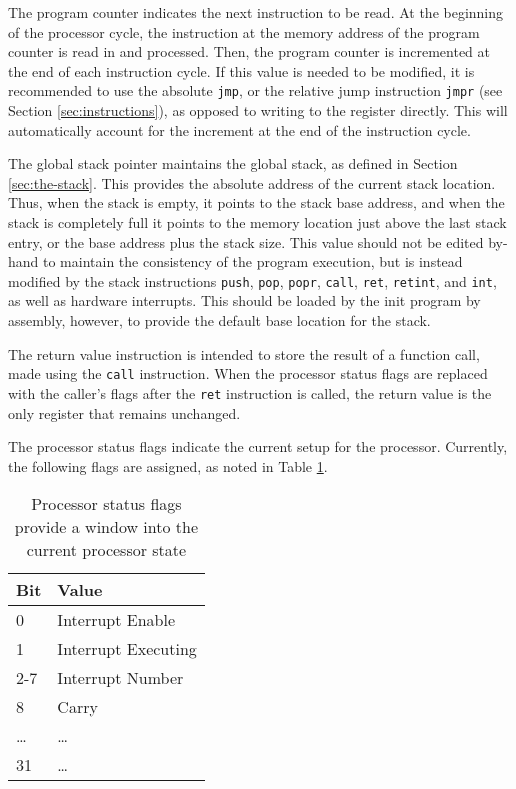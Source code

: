 \documentclass{article}
\begin{document}
The program counter indicates the next instruction to be read. At the beginning of the processor cycle, the instruction at the memory address of the program counter is read in and processed. Then, the program counter is incremented at the end of each instruction cycle. If this value is needed to be modified, it is recommended to use the absolute \texttt{jmp}, or the relative jump instruction \texttt{jmpr} (see Section \ref{sec:instructions}), as opposed to writing to the register directly. This will automatically account for the increment at the end of the instruction cycle.

The global stack pointer maintains the global stack, as defined in Section \ref{sec:the-stack}. This provides the absolute address of the current stack location. Thus, when the stack is empty, it points to the stack base address, and when the stack is completely full it points to the memory location just above the last stack entry, or the base address plus the stack size. This value should not be edited by-hand to maintain the consistency of the program execution, but is instead modified by the stack instructions \texttt{push}, \texttt{pop}, \texttt{popr}, \texttt{call}, \texttt{ret}, \texttt{retint}, and \texttt{int}, as well as hardware interrupts. This should be loaded by the init program by assembly, however, to provide the default base location for the stack.

The return value instruction is intended to store the result of a function call, made using the \texttt{call} instruction. When the processor status flags are replaced with the caller's flags after the \texttt{ret} instruction is called, the return value is the only register that remains unchanged.

The processor status flags indicate the current setup for the processor. Currently, the following flags are assigned, as noted in Table \ref{table:processor-flags}.

\begin{table}[h!]
    \centering
    \begin{tabular}{l|l}
        \hline
        Bit & Value \\
        \hline
        0 & Interrupt Enable \\
        1 & Interrupt Executing \\
        2-7 & Interrupt Number \\
        8 & Carry \\
        \dots & \dots \\
        31 & \dots \\
        \hline
    \end{tabular}
    \caption{Processor status flags provide a window into the current processor state}
    \label{table:processor-flags}
\end{table}
\end{document}
